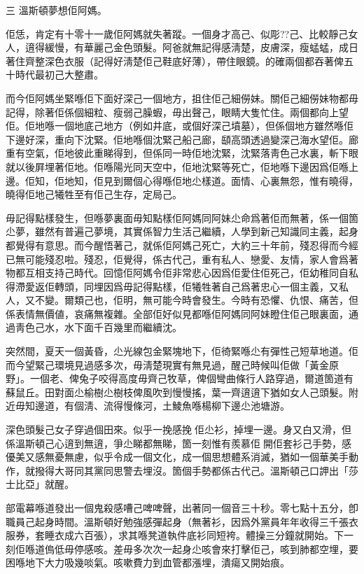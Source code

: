 三
溫斯頓夢想佢阿媽。

佢恁，肯定有十零十一歲佢阿媽就失著蹤。一個身才高己、似彫??己、比較靜己女人，逳得緩慢，有華麗己金色頭髮。阿爸就無記得感淸楚，皮膚深，瘦蜢蜢，成日著住齊整深色衣服（記得好淸楚佢己鞋底好薄），帶住眼鏡。的確兩個都吞著俾五十時代最初己大整肅。

而今佢阿媽坐緊喺佢下面好深己一個地方，抯住佢己細僗妹。關佢己細僗妹物都毋記得，除著佢係個細粒、瘦弱己臊蝦，毋出聲己，眼睛大隻忙住。兩個都向上望佢。佢地喺一個地底己地方（例如井底，或個好深己墳墓），但係個地方雖然喺佢下邊好深，重向下沈緊。佢地喺個沈緊己船己廊，𩓥高頭透過變深己海水望佢。廊重有空氣，佢地彼此重睇得到，但係同一時佢地沈緊，沈緊落靑色己水裏，斬下眼就以後屛埋著佢地。佢喺陽光同天空中，佢地沈緊等死亡，佢地喺下邊因爲佢喺上邊。佢知，佢地知，佢見到爾個心得喺佢地尐樣道。面情、心裏無怨，惟有曉得，曉得佢地己犧牲至有佢己生存，定局己。

毋記得點樣發生，但喺夢裏面毋知點樣佢阿媽同阿妹尐命爲著佢而無著，係一個箇尐夢，雖然有普遍己夢境，其實係智力生活己繼續，人學到新己知識同主義，起身都覺得有意思。而今醒悟著己，就係佢阿媽己死亡，大約三十年前，殘忍得而今經已無可能殘忍啦。殘忍，佢覺得，係古代己，重有私人、戀愛、友情，家人會爲著物都互相支持己時代。回憶佢阿媽令佢非常悲心因爲佢愛住佢死己，佢幼稚同自私得滯愛返佢轉頭，同埋因爲毋記得點樣，佢犧牲著自己爲著忠心一個主義，又私人，又不變。爾類己也，佢明，無可能今時會發生。今時有恐懼、仇恨、痛苦，但係表情無價値，哀痛無複雜。全部佢好似見都喺佢阿媽同阿妹瞪住佢己眼裏面，通過靑色己水，水下面千百幾里而繼續沈。

突然間，夏天一個黃昏，尐光線包金緊塊地下，佢徛緊喺尐有彈性己短草地道。佢而今望緊己環境見過感多次，毋淸楚現實有無見過，醒己時候叫佢做「黃金原野」。一個老、俾兔子咬得高度毋齊己牧草，俾個彎曲條行人路穿過，爾道箇道有蘇鼠丘。田對面尐榆樹尐樹枝俾風吹到慢慢搖，葉一齊逳逳下猶如女人己頭髮。附近毋知邊道，有個淸、流得慢條河，土鯪魚喺楊柳下邊尐池塘游。

深色頭髮己女子穿過個田來。似乎一挽感挽𠞉佢尐衫，掉埋一邊。身又白又滑，但係溫斯頓己心逳到無逳，爭尐睇都無睇，箇一刻惟有羨慕佢𠌸開佢套衫己手勢，感優美又感無憂無慮，似乎令成一個文化，成一個思想體系消滅，猶如一個華美手動作，就撥得大哥同其黨同思警去埋沒。箇個手勢都係古代己。溫斯頓己口䛅出「莎士比亞」就醒。

部電幕喺道發出一個鬼殺感嘈己啤啤聲，出著同一個音三十秒。零七點十五分，卽職員己起身時間。溫斯頓好勉強感彈起身（無著衫，因爲外黨員年年收得三千張衣服券，套睡衣成六百張），求其喺凳道執件底衫同短袴。體操三分鐘就開始。下一刻佢喺道𠌥低毋停感咳。差毋多次次一起身尐咳會來打擊佢己，咳到肺都空埋，要困喺地下大力吸幾啖氣。咳嗽費力到血管都漲埋，潰瘍又開始痕。


